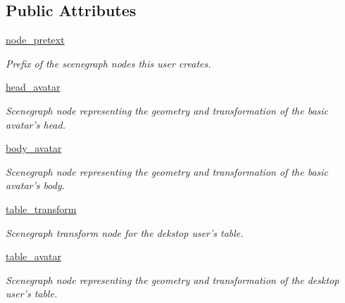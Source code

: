 \subsection*{\-Public \-Attributes}
\begin{DoxyCompactItemize}
\item 
\hyperlink{classlib_1_1User_1_1User_af909d4906b92076798e62e6db9d1174c}{node\-\_\-pretext}
\begin{DoxyCompactList}\small\item\em \-Prefix of the scenegraph nodes this user creates. \end{DoxyCompactList}\item 
\hyperlink{classlib_1_1User_1_1User_a83a122dc9723a70d15bcc6562f051501}{head\-\_\-avatar}
\begin{DoxyCompactList}\small\item\em \-Scenegraph node representing the geometry and transformation of the basic avatar's head. \end{DoxyCompactList}\item 
\hyperlink{classlib_1_1User_1_1User_ac1fe60f0d865c0f1301dd80e46ad38fe}{body\-\_\-avatar}
\begin{DoxyCompactList}\small\item\em \-Scenegraph node representing the geometry and transformation of the basic avatar's body. \end{DoxyCompactList}\item 
\hyperlink{classlib_1_1User_1_1User_a227267a7e99f6ed9babb200558d580a8}{table\-\_\-transform}
\begin{DoxyCompactList}\small\item\em \-Scenegraph transform node for the dekstop user's table. \end{DoxyCompactList}\item 
\hyperlink{classlib_1_1User_1_1User_a6b26285528c0979839c12dc0794300c3}{table\-\_\-avatar}
\begin{DoxyCompactList}\small\item\em \-Scenegraph node representing the geometry and transformation of the desktop user's table. \end{DoxyCompactList}\end{DoxyCompactItemize}
